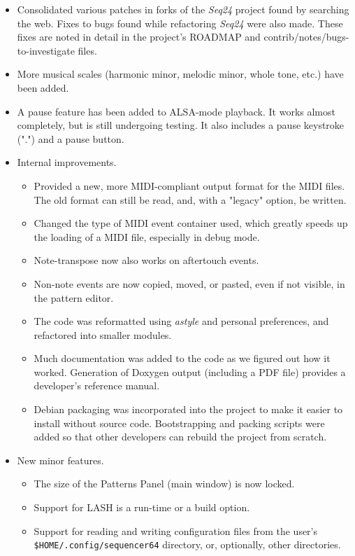 \documentclass[
 11pt,
 twoside,
 a4paper,
 headinclude,
 footinclude,
 final                                 %
]{article}
\begin{document}
\begin{itemize}
\begin{itemize}
      \end{itemize}
      \item Consolidated various patches in forks of the \textsl{Seq24}
         project found by searching the web.  Fixes to bugs found while
         refactoring \textsl{Seq24} were also made.  These fixes are noted in
         detail in the project's ROADMAP and contrib/notes/bugs-to-investigate
         files.
      \item More musical scales (harmonic minor, melodic minor,
         whole tone, etc.) have been added.
      \item A pause feature has been added to ALSA-mode playback.  It works
         almost completely, but is still undergoing testing.  It also includes
         a pause keystroke (".") and a pause button.
      \item Internal improvements.
      \begin{itemize}
         \item Provided a new, more MIDI-compliant output format for the MIDI
            files.  The old format can still be read, and, with a "legacy"
            option, be written.
         \item Changed the type of MIDI event container used, which greatly
            speeds up the loading of a MIDI file, especially in debug mode.
         \item Note-transpose now also works on aftertouch events.
         \item Non-note events are now copied, moved, or pasted, even if not
            visible, in the pattern editor.
         \item The code was reformatted using \textsl{astyle} and
            personal preferences, and refactored into smaller modules.
         \item Much documentation was added to the code as we figured
            out how it worked.  Generation of Doxygen output (including a PDF
            file) provides a developer's reference manual.
         \item Debian packaging was incorporated into the project to make it
            easier to install without source code.  Bootstrapping and
            packing scripts were added so that other developers can rebuild the
            project from scratch.
      \end{itemize}
      \item New minor features.
      \begin{itemize}
         \item The size of the Patterns Panel (main window) is now locked.
         \item Support for LASH is a run-time or a build option.
         \item Support for reading and writing configuration files from the
            user's \texttt{\$HOME/.config/sequencer64} directory, or,
            optionally, other directories.
      \end{itemize}
   \end{itemize}
\end{document}
